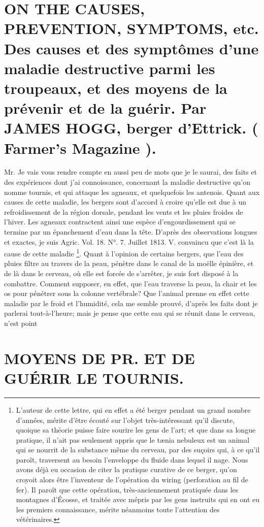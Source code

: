 \setcounter{page}{241}
 \section{ON THE CAUSES, PREVENTION, SYMPTOMS, etc. Des causes et des symptômes d'une maladie destructive parmi les troupeaux, et des moyens de la prévenir et de la guérir. Par JAMES HOGG, berger d'Ettrick. ( Farmer's Magazine ).}
Mr.
Je vais vous rendre compte en aussi peu de mots que je le saurai, des faits et des expériences dont j'ai connoissance, concernant la maladie destructive qu'on nomme tournis, et qui attaque les agneaux, et quelquefois les antenois.
Quant aux causes de cette maladie, les bergers sont d'accord à croire qu'elle est due à un refroidissement de la région dorsale, pendant les vents et les pluies froides de l'hiver. Les agneaux contractent ainsi une espèce d'engourdissement qui se termine par un épanchement d'eau dans la tête. D'après des observations longues et exactes, je suis
Agric. Vol. 18. N°. 7. Juillet 1813. V.\setcounter{page}{242} convaincu que c'est là la cause de cette maladie \footnote{L'auteur de cette lettre, qui en effet a été berger pendant un grand nombre d'années, mérite d'être écouté sur l'objet très-intéressant qu'il discute, quoique sa théorie puisse faire sourire les gens de l'art; et que dans sa longue pratique, il n'ait pas seulement appris que le tænia nebuleux est un animal qui se nourrit de la substance même du cerveau, par des suçoirs qui, à ce qu'il paroît, traversent au besoin l'enveloppe du fluide dans lequel il nage. Nous avons déjà eu occasion de citer la pratique curative de ce berger, qu'on croyoit alors être l'inventeur de l'opération du wiring (perforation au fil de fer). Il paroît que cette opération, très-anciennement pratiquée dans les montagnes d'Écosse, et traitée avec mépris par les gens instruits qui en ont eu les premiers connaissance, mérite néanmoins toute l'attention des vétérinaires.}. Quant à l'opinion de certains bergers, que l'eau des pluies filtre au travers de la peau, pénètre dans le canal de la moëlle épinière, et de là dans le cerveau, où elle est forcée de s'arrêter, je suis fort disposé à la combattre. Comment supposer, en effet, que l'eau traverse la peau, la chair et les os pour pénétrer sous la colonne vertébrale? Que l'animal prenne en effet cette maladie par le froid et l'humidité, cela me semble prouvé, d'après les faits dont je parlerai tout-à-l'heure; mais je pense que cette eau qui se réunit dans le cerveau, n'est point\setcounter{page}{243} \section{MOYENS DE PR. ET DE GUÉRIR LE TOURNIS.}
